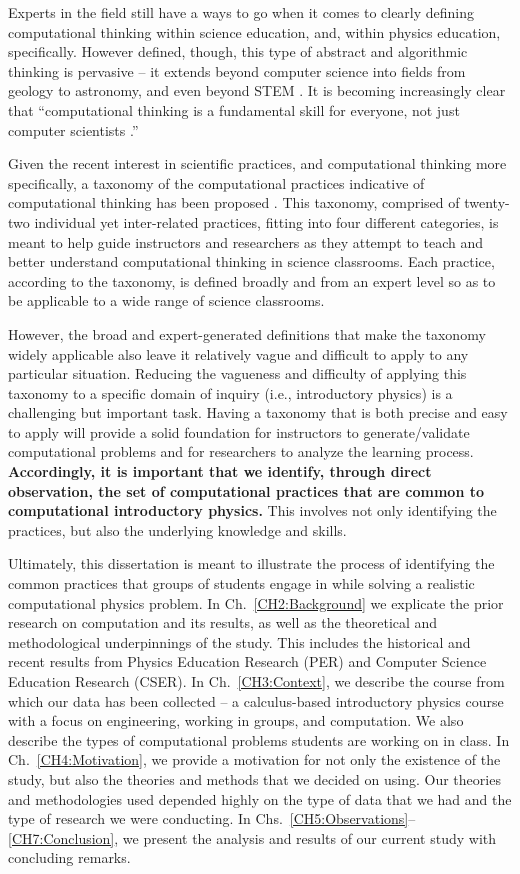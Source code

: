 \documentclass{msuphddissertation}
\begin{document}
\begin{doublespace}
Experts in the field still have a ways to go when it comes to clearly defining computational thinking within science education, and, within physics education, specifically.  However defined, though, this type of abstract and algorithmic thinking is pervasive -- it extends beyond computer science into fields from geology to astronomy, and even beyond STEM \cite{Bundy2007}.  It is becoming increasingly clear that ``computational thinking is a fundamental skill for everyone, not just computer scientists \cite{Wing2006}.''

Given the recent interest in scientific practices, and computational thinking more specifically, a taxonomy of the computational practices indicative of computational thinking has been proposed \cite{Weintrop2015}.  This taxonomy, comprised of twenty-two individual yet inter-related practices, fitting into four different categories, is meant to help guide instructors and researchers as they attempt to teach and better understand computational thinking in science classrooms.  Each practice, according to the taxonomy, is defined broadly and from an expert level so as to be applicable to a wide range of science classrooms.

However, the broad and expert-generated definitions that make the taxonomy widely applicable also leave it relatively vague and difficult to apply to any particular situation.  Reducing the vagueness and difficulty of applying this taxonomy to a specific domain of inquiry (i.e., introductory physics) is a challenging but important task.  Having a taxonomy that is both precise and easy to apply will provide a solid foundation for instructors to generate/validate computational problems and for researchers to analyze the learning process.  \textbf{Accordingly, it is important that we identify, through direct observation, the set of computational practices that are common to computational introductory physics.}  This involves not only identifying the practices, but also the underlying knowledge and skills.

Ultimately, this dissertation is meant to illustrate the process of identifying the common practices that groups of students engage in while solving a realistic computational physics problem.  In Ch.~\ref{CH2:Background} we explicate the prior research on computation and its results, as well as the theoretical and methodological underpinnings of the study.  This includes the historical and recent results from Physics Education Research (PER) and Computer Science Education Research (CSER).  In Ch.~\ref{CH3:Context}, we describe the course from which our data has been collected -- a calculus-based introductory physics course with a focus on engineering, working in groups, and computation.  We also describe the types of computational problems students are working on in class.  In Ch.~\ref{CH4:Motivation}, we provide a motivation for not only the existence of the study, but also the theories and methods that we decided on using.  Our theories and methodologies used depended highly on the type of data that we had and the type of research we were conducting.  In Chs.~\ref{CH5:Observations}--\ref{CH7:Conclusion}, we present the analysis and results of our current study with concluding remarks.


\end{doublespace}
\end{document}
